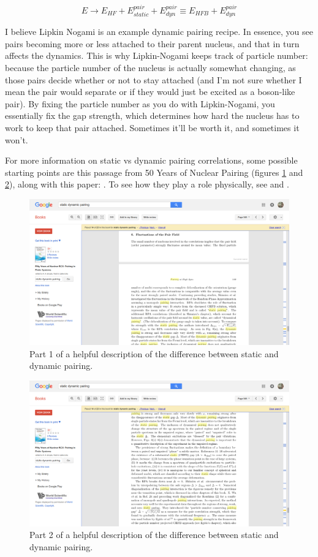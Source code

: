\begin{equation*}
E \rightarrow E_{HF} + E^{pair}_{static} + E^{pair}_{dyn} \equiv E_{HFB} + E^{pair}_{dyn}
\end{equation*}

I believe Lipkin Nogami is an example dynamic pairing recipe. In essence, you see pairs becoming more or less attached to their parent nucleus, and that in turn affects the dynamics. This is why Lipkin-Nogami keeps track of particle number: because the particle number of the nucleus is actually somewhat changing, as those pairs decide whether or not to stay attached (and I'm not sure whether I mean the pair would separate or if they would just be excited as a boson-like pair). By fixing the particle number as you do with Lipkin-Nogami, you essentially fix the gap strength, which determines how hard the nucleus has to work to keep that pair attached. Sometimes it'll be worth it, and sometimes it won't.

For more information on static vs dynamic pairing correlations, some possible starting points are this passage from 50 Years of Nuclear Pairing (figures \ref{fig:static_dynamic_pairing1} and \ref{fig:static_dynamic_pairing2}), along with this paper: \cite{SHIMIZU1990c477}. To see how they play a role physically, see \cite{SHIMIZU198733} and \cite{MORETTO19721}.

\begin{figure}
\centering
\includegraphics[width=0.7\linewidth]{TeX_files/static_dynamic_pairing1}
\caption{Part 1 of a helpful description of the difference between static and dynamic pairing.}
\label{fig:static_dynamic_pairing1}
\end{figure}

\begin{figure}
\centering
\includegraphics[width=0.7\linewidth]{TeX_files/static_dynamic_pairing2}
\caption{Part 2 of a helpful description of the difference between static and dynamic pairing.}
\label{fig:static_dynamic_pairing2}
\end{figure}



